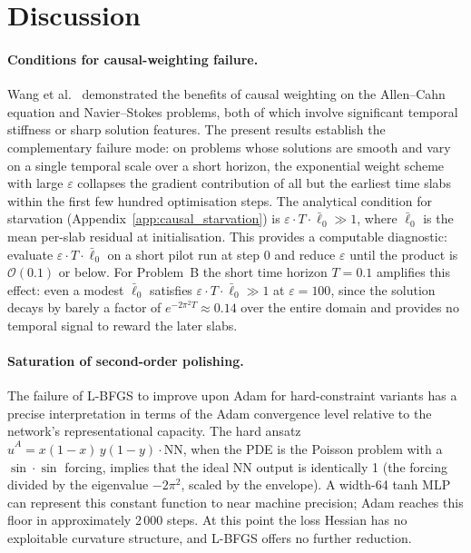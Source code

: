 \documentclass{article}
\begin{document}
\section{Discussion}
\label{sec:discussion}

\paragraph{Conditions for causal-weighting failure.}
Wang et al.~\citep{wang2022causal} demonstrated the benefits of causal
weighting on the Allen--Cahn equation and Navier--Stokes problems, both of
which involve significant temporal stiffness or sharp solution features.
The present results establish the complementary failure mode: on problems
whose solutions are smooth and vary on a single temporal scale over a short
horizon, the exponential weight scheme with large $\varepsilon$ collapses
the gradient contribution of all but the earliest time slabs within the
first few hundred optimisation steps.
The analytical condition for starvation (Appendix~\ref{app:causal_starvation})
is $\varepsilon \cdot T \cdot \bar{\ell}_0 \gg 1$, where $\bar{\ell}_0$ is
the mean per-slab residual at initialisation.
This provides a computable diagnostic: evaluate $\varepsilon \cdot T \cdot \bar{\ell}_0$
on a short pilot run at step 0 and reduce $\varepsilon$ until the product is
$\mathcal{O}(0.1)$ or below.
For Problem~B the short time horizon $T=0.1$ amplifies this effect: even a
modest $\bar{\ell}_0$ satisfies $\varepsilon \cdot T \cdot \bar{\ell}_0 \gg 1$
at $\varepsilon=100$, since the solution decays by barely a factor of
$e^{-2\pi^2 T}\approx0.14$ over the entire domain and provides no temporal
signal to reward the later slabs.

\paragraph{Saturation of second-order polishing.}
The failure of L-BFGS to improve upon Adam for hard-constraint variants has a
precise interpretation in terms of the Adam convergence level relative to the
network's representational capacity.
The hard ansatz $\hat{u}^A = x(1{-}x)\,y(1{-}y)\cdot\mathrm{NN}$, when the PDE
is the Poisson problem with a $\sin\cdot\sin$ forcing, implies that the ideal
NN output is identically 1 (the forcing divided by the eigenvalue $-2\pi^2$,
scaled by the envelope).
A width-64 tanh MLP can represent this constant function to near machine
precision; Adam reaches this floor in approximately 2\,000 steps.
At this point the loss Hessian has no exploitable curvature structure, and
L-BFGS offers no further reduction.
\end{document}
